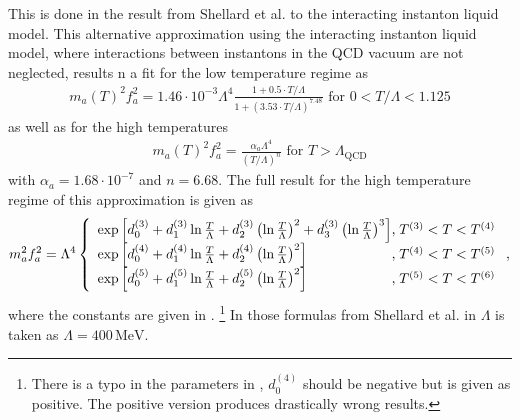 \documentclass[a4paper, 12pt]{article}
\begin{document}
This is done in the result from Shellard et al. \cite{LatticQCD4Cosmo} to the interacting instanton liquid model.
This alternative approximation using the interacting instanton liquid model, where interactions between instantons in the QCD vacuum are not neglected, results n
 a fit for the low temperature regime as \cite[Sec. III, Page 8, Eq. 19]{AxionCosmoRev}
\begin{align}
    \label{eq:m_a_low_temp_shellard}
    m_a(T)^2 f_a^2 = 1.46 \cdot 10^{-3} \Lambda^4 \frac{1 + 0.5 \cdot T / \Lambda}{1 + (3.53 \cdot T / \Lambda)^{7.48}} \, \, \mathrm{for} \, \, 0 < T / \Lambda < 1.125
\end{align}
as well as \cite[Sec III, Page 9, Eq. 22]{AxionCosmoRev} for the high temperatures
\begin{align}
    \label{eq:m_a_high_temp_shellard}
    m_a(T)^2 f_a^2 = \frac{\alpha_a \Lambda^4}{(T / \Lambda)^n} \, \, \mathrm{for} \, \, T > \Lambda_\mathrm{QCD}
\end{align}
with $\alpha_a = 1.68 \cdot 10^{-7}$ and $n = 6.68$.
The full result for the high temperature regime of this approximation is given as \cite[Sec. III, Eq. 20]{AxionCosmoRev}
\begin{align}
m^2_a f^2_a = \Lambda^4
\left\{
 \begin{array}{l@{,\;}l}
 \exp\left[ d^{(3)}_0 + d^{(3)}_1 \ln\frac{T}{\Lambda} + d^{(3)}_2 \left(\ln\frac{T}{\Lambda}\right)^2 + d^{(3)}_3 \left(\ln\frac{T}{\Lambda}\right)^3 \right] & T^{(3)} < T < T^{(4)}\\
 \exp\left[ d^{(4)}_0 + d^{(4)}_1 \ln\frac{T}{\Lambda} + d^{(4)}_2 \left(\ln\frac{T}{\Lambda}\right)^2 \right] & T^{(4)} < T < T^{(5)}\\
\exp\left[ d^{(5)}_0 + d^{(5)}_1 \ln\frac{T}{\Lambda} + d^{(5)}_2 \left(\ln\frac{T}{\Lambda}\right)^2 \right] & T^{(5)} < T < T^{(6)}\\
\end{array}
\right. ,
\end{align}
where the constants are given
in \cite[Sec. III, Eq. 21]{AxionCosmoRev}.    \footnote{There is a typo in the parameters in \cite[Sec. III, Eq. 21]{AxionCosmoRev}, $d_0^{(4)}$ should be negative but is given as positive. The positive version produces drastically wrong results.}
In those formulas from Shellard et al. in \cite{LatticQCD4Cosmo} $\Lambda$ is taken as $\Lambda = 400 \, \mathrm{MeV}$.
\end{document}
